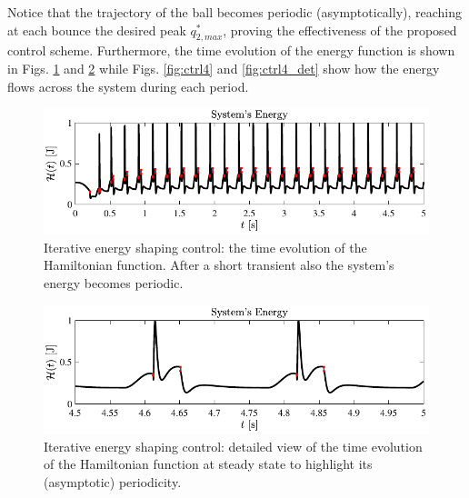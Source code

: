 %
%
Notice that the trajectory of the ball becomes periodic (asymptotically), reaching at each bounce the desired peak $q_{2,max}^*$, proving the effectiveness of the proposed control scheme. Furthermore, the time evolution of the energy function is shown in Figs. \ref{fig:ctrl3} and \ref{fig:ctrl3_det} while Figs. \ref{fig:ctrl4} and \ref{fig:ctrl4_det} show how the energy flows across the system during each period. 
%
\begin{figure}[!h]
	\centering
	\includegraphics[width=\linewidth]{Figures/ctrl3.pdf}
	\caption{Iterative energy shaping control: the time evolution of the Hamiltonian function. After a short transient also the system's energy becomes periodic.}
	\label{fig:ctrl3}
\end{figure}
%
\begin{figure}[!h]
	\centering
	\includegraphics[width=\linewidth]{Figures/ctrl3_det.pdf}
	\caption{Iterative energy shaping control: detailed view of the time evolution of the Hamiltonian function at steady state to highlight its (asymptotic) periodicity.}
	\label{fig:ctrl3_det}
\end{figure}
%
